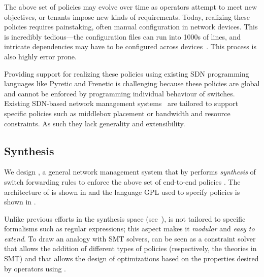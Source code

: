 
The above set of policies may evolve over time as operators attempt to
meet new objectives, or tenants impose new kinds of
requirements. Today, realizing these policies requires painstaking,
often manual configuration in network devices. This is incredibly
tedious---the configuration files can run into 1000s of lines, and
intricate dependencies may have to be configured across
devices~\cite{benson:complexity:nsdi2009,mpa-imc15}. This process is also highly 
error prone.

Providing support for realizing these policies using existing SDN
programming languages like Pyretic and Frenetic is challenging
because these policies are global and cannot be enforced by
programming individual behaviour of switches. Existing SDN-based
network management systems~\cite{simple,merlin,oneswitch} are tailored
to support specific policies such as middlebox placement or bandwidth
and resource constraints. As such they lack generality and
extensibility.

  
\subsection{Synthesis} \label{sec:synthesis} 



We design \name, a general network management system that 
by performs {\em synthesis} of switch forwarding
rules to enforce the above set of end-to-end policies . The architecture of \name
is shown in  and the 
language GPL used to specify policies
is shown in .

Unlike previous efforts in the synthesis space (see~\cite{netgen,merlin}), \Name is
not tailored to specific formalisms such as regular expressions; 
this aspect makes it {\em modular} and {\em easy to extend}.
To draw an analogy with SMT solvers, \Name can be seen as a constraint
solver that allows the addition of different types of policies
(respectively, the theories in SMT) and that allows the design of
optimizations based on the properties desired by 
  operators using \Name. 
  
